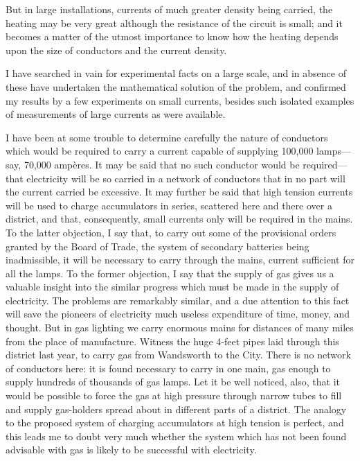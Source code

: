 \documentclass[12pt,oneside]{book}[2021/10/04]
\begin{document}
But in large installations, currents of much greater density
being carried, the heating may be very great although the
resistance of the circuit is small; and it becomes a matter of the
utmost importance to know how the heating depends upon the
size of conductors and the current density.

I have searched in vain for experimental facts on a large scale,
and in absence of these have undertaken the mathematical
solution of the problem, and confirmed my results by a few
experiments on small currents, besides such isolated examples of
measurements of large currents as were available.

I have been at some trouble to determine carefully the nature
of conductors which would be required to carry a current capable
of supplying 100,000 lamps—say, 70,000 ampères. It may be said
that no such conductor would be required—that electricity will be
so carried in a network of conductors that in no part will the
current carried be excessive. It may further be said that high
tension currents will be used to charge accumulators in series,
scattered here and there over a district, and that, consequently,
small currents only will be required in the mains. To the latter
objection, I say that, to carry out some of the provisional orders
granted by the Board of Trade, the system of secondary batteries
being inadmissible, it will be necessary to carry through the
mains, current sufficient for all the lamps. To the former objection,
I say that the supply of gas gives us a valuable insight into
the similar progress which must be made in the supply of electricity.
The problems are remarkably similar, and a due attention
to this fact will save the pioneers of electricity much useless
expenditure of time, money, and thought. But in gas lighting
we carry enormous mains for distances of many miles from the
place of manufacture. Witness the huge 4-feet pipes laid
through this district last year, to carry gas from Wandsworth to
the City. There is no network of conductors here: it is found
necessary to carry in one main, gas enough to supply hundreds of
thousands of gas lamps. Let it be well noticed, also, that it
would be possible to force the gas at high pressure through narrow
tubes to fill and supply gas-holders spread about in different
parts of a district. The analogy to the proposed system of
charging accumulators at high tension is perfect, and this leads
me to doubt very much whether the system which has not been
found advisable with gas is likely to be successful with electricity.
\end{document}
